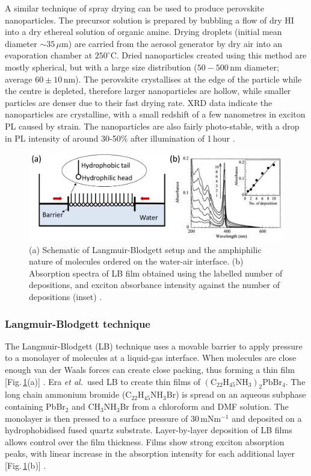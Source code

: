 A similar technique of spray drying can be used to produce perovskite nanoparticles. The precursor solution is prepared by bubbling a flow of dry HI into a dry ethereal solution of organic amine. Drying droplets (initial mean diameter $\sim 35\,\mu$m) are carried from the aerosol generator by dry air into an evaporation chamber at $250^{\circ}$C. Dried nanoparticles created using this method are mostly spherical, but with a large size distribution ($50-500$\,nm diameter; average $60\pm10$\,nm). The perovskite crystallises at the edge of the particle while the centre is depleted, therefore larger nanoparticles are hollow, while smaller particles are denser due to their fast drying rate. XRD data indicate the nanoparticles are crystalline, with a small redshift of a few nanometres in exciton PL caused by strain. The nanoparticles are also fairly photo-stable, with a drop in PL intensity of around 30-50\% after illumination of 1\,hour \cite{Audebert2009a}.

\begin{figure} [h!]
\centering
\includegraphics[width=\textwidth]{Fig6}
\caption{(a) Schematic of Langmuir-Blodgett setup and the amphiphilic nature of molecules ordered on the water-air interface. (b) Absorption spectra of LB film obtained using the labelled number of depositions, and exciton absorbance intensity against the number of depositions (inset) \cite{Era2000}.}
\label{2Fig6}
\end{figure}
\subsubsection {Langmuir-Blodgett technique}
The Langmuir-Blodgett (LB) technique uses a movable barrier to apply pressure to a monolayer of molecules at a liquid-gas interface. When molecules are close enough van der Waals forces can create close packing, thus forming a thin film [Fig.\,\ref{2Fig6}(a)] \cite{Mitzi2001b}. Era \textit{et al.}\ used LB to create thin films of $(\textrm{C}_{22}\textrm{H}_{45}\textrm{NH}_3)_2\textrm{PbBr}_4$. The long chain ammonium bromide ($\textrm{C}_{22}\textrm{H}_{45}\textrm{NH}_3$Br) is spread on an aqueous subphase containing Pb$\textrm{Br}_2$ and $\textrm{CH}_3\textrm{NH}_3$Br from a chloroform and DMF solution. The monolayer is then pressed to a surface pressure of 30\,mN$\textrm{m}^{-1}$ and deposited on a hydrophobidised fused quartz substrate. Layer-by-layer deposition of LB films allows control over the film thickness. Films show strong exciton absorption peaks, with linear increase in the absorption intensity for each additional layer [Fig.\,\ref{2Fig6}(b)] \cite{Era2000}.

